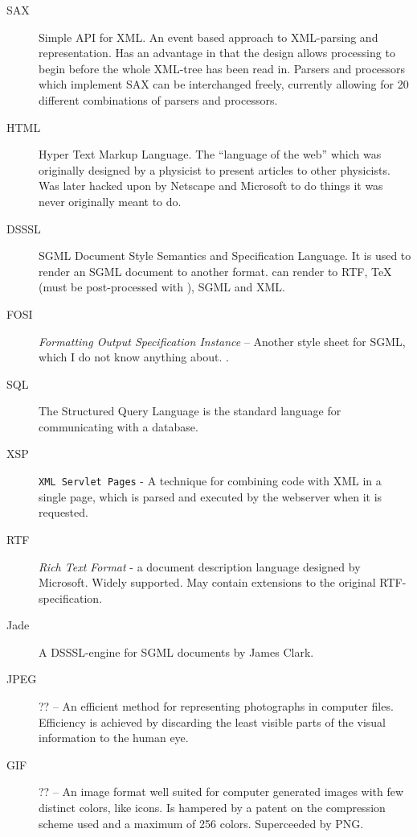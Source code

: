 \begin{description}
\item[SAX] Simple API for XML.  An event based approach to XML-parsing
  and representation.  Has an advantage in that the design allows
  processing to begin before the whole XML-tree has been read in.
  Parsers and processors which implement SAX can be interchanged
  freely, currently allowing for 20 different combinations of parsers
  and processors.


\item[HTML] Hyper Text Markup Language.  The ``language of the web''
  which was originally designed by a physicist to present articles to
  other physicists.  Was later hacked upon by Netscape and Microsoft
  to do things it was never originally meant to do.

  
\item[DSSSL] SGML Document Style Semantics and Specification Language.
  It is used to render an SGML document to another format.
   can render to RTF, {\TeX} (must be
  post-processed with ), SGML and XML.
  
\item[FOSI] \textit{Formatting Output Specification Instance} --
  Another style sheet for SGML, which I do not know anything about.
  .

  
\item[SQL] The Structured Query Language is the standard
  language for communicating with a database.

  
\item[XSP] \texttt{XML Servlet Pages} - A technique for combining code
  with XML in a single page, which is parsed and executed by the
  webserver when it is requested.
  
\item[RTF] \textit{Rich Text Format} - a document description language
  designed by Microsoft.  Widely supported.  May contain extensions to
  the original RTF-specification.

\item[Jade] A DSSSL-engine for SGML documents by James Clark.
  
\item[JPEG] \textsf{??} -- An efficient method for representing photographs in
  computer files.  Efficiency is achieved by discarding the least
  visible parts of the visual information to the human eye.
  
\item[GIF] \textsf{??} -- An image format well suited for computer
  generated images with few distinct colors, like icons.  Is hampered
  by a patent on the compression scheme used and a maximum of 256
  colors.  Superceeded by PNG.
  

\end{description}
